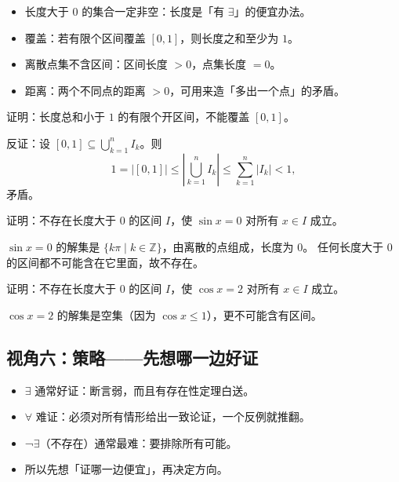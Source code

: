 \begin{explore}
\begin{itemize}
  \item 长度大于 $0$ 的集合一定非空：长度是「有 $\exists$」的便宜办法。
  \item 覆盖：若有限个区间覆盖 $[0,1]$，则长度之和至少为 $1$。
  \item 离散点集不含区间：区间长度 $>0$，点集长度 $=0$。
  \item 距离：两个不同点的距离 $>0$，可用来造「多出一个点」的矛盾。
\end{itemize}

\begin{example}
证明：长度总和小于 $1$ 的有限个开区间，不能覆盖 $[0,1]$。
\end{example}
\begin{solution}
反证：设 $[0,1]\subseteq\bigcup_{k=1}^n I_k$。则
\[
  1=|[0,1]|\leq\left|\bigcup_{k=1}^n I_k\right|\leq\sum_{k=1}^n|I_k|<1,
\]
矛盾。
\end{solution}

\begin{example}
证明：不存在长度大于 $0$ 的区间 $I$，使 $\sin x=0$ 对所有 $x\in I$ 成立。
\end{example}
\begin{solution}
$\sin x=0$ 的解集是 $\{k\pi\mid k\in\mathbb{Z}\}$，由离散的点组成，长度为 $0$。
任何长度大于 $0$ 的区间都不可能含在它里面，故不存在。
\end{solution}

\begin{problem}
证明：不存在长度大于 $0$ 的区间 $I$，使 $\cos x=2$ 对所有 $x\in I$ 成立。
\end{problem}
\begin{solution}
$\cos x=2$ 的解集是空集（因为 $\cos x\leq1$），更不可能含有区间。
\end{solution}

\subsection{视角六：策略——先想哪一边好证}

\begin{itemize}
  \item $\exists$ 通常好证：断言弱，而且有存在性定理白送。
  \item $\forall$ 难证：必须对所有情形给出一致论证，一个反例就推翻。
  \item ¬$\exists$（不存在）通常最难：要排除所有可能。
  \item 所以先想「证哪一边便宜」，再决定方向。
\end{itemize}


\end{explore}
